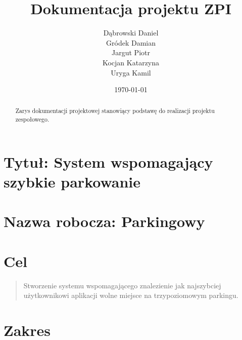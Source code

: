 \documentclass[12pt,a4paper]{article}
\begin{document}
\title{Dokumentacja projektu ZPI}
\author{Dąbrowski Daniel\\ Gródek Damian\\ Jargut Piotr\\ Kocjan Katarzyna\\ Uryga Kamil}
\date{\today}

\maketitle

\begin{abstract}
Zarys dokumentacji projektowej stanowiący podstawę do realizacji projektu \\ zespołowego. 
\end{abstract}



\newpage

\tableofcontents
\listoftables
\listoffigures



\newpage

\section{Tytuł: System wspomagający szybkie parkowanie}

\section{Nazwa robocza: Parkingowy}

\section{Cel}
\begin{quotation}
Stworzenie systemu wspomagającego znalezienie jak najszybciej \\użytkownikowi aplikacji wolne miejsce na trzypoziomowym parkingu.
\end{quotation}

\section{Zakres}
\end{document}

